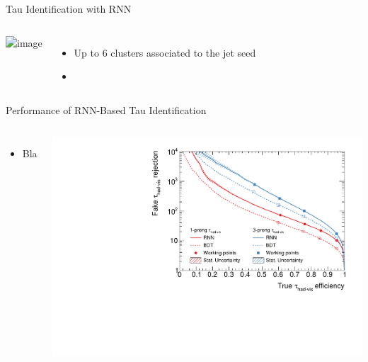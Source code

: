 \documentclass[11pt, xcolor={dvipsnames}, aspectratio=169]{beamer}
\begin{document}
\begin{frame}{Tau Identification with RNN}
\begin{columns}[onlytextwidth]
\begin{columns}[onlytextwidth]
      \centering

      \includegraphics<1>[width=0.9\textwidth]{tauid/invars/invars_cls1relet_3P}
    \end{columns}

    \vspace*{0.5em}

    \begin{itemize}
    \item Up to 6 clusters associated to the jet seed
    \item
    \end{itemize}
  \end{columns}
\end{frame}


\begin{frame}{Performance of RNN-Based Tau Identification}

  \begin{columns}[onlytextwidth]
    \begin{itemize}
    \item Bla
    \end{itemize}

    \includegraphics[width=1.0\textwidth]{tauid/roc_incl_witherrors}
  \end{columns}
\end{frame}

\end{document}
